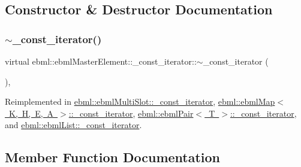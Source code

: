 \subsection{Constructor \& Destructor Documentation}
\mbox{\label{classebml_1_1ebmlMasterElement_1_1__const__iterator_a6138f42b88ff06379d96a095a12ed136}} 
\subsubsection{\texorpdfstring{$\sim$\+\_\+const\+\_\+iterator()}{~\_const\_iterator()}}
{\footnotesize\ttfamily virtual ebml\+::ebml\+Master\+Element\+::\+\_\+const\+\_\+iterator\+::$\sim$\+\_\+const\+\_\+iterator (\begin{DoxyParamCaption}{ }\end{DoxyParamCaption})\hspace{0.3cm}{\ttfamily [inline]}, {\ttfamily [virtual]}}



Reimplemented in \mbox{\hyperlink{classebml_1_1ebmlMultiSlot_1_1__const__iterator_af518a921ebb2e2734b4d045d7d8be0f1}{ebml\+::ebml\+Multi\+Slot\+::\+\_\+const\+\_\+iterator}}, \mbox{\hyperlink{classebml_1_1ebmlMap_1_1__const__iterator_a4f230319e3c3dfa23ed8418d05ec8cc6}{ebml\+::ebml\+Map$<$ K, H, E, A $>$\+::\+\_\+const\+\_\+iterator}}, \mbox{\hyperlink{classebml_1_1ebmlPair_1_1__const__iterator_a2031860865632624af0ff271e7442089}{ebml\+::ebml\+Pair$<$ T $>$\+::\+\_\+const\+\_\+iterator}}, and \mbox{\hyperlink{classebml_1_1ebmlList_1_1__const__iterator_ad0a42056feeeb952125dcedd4eecb2a6}{ebml\+::ebml\+List\+::\+\_\+const\+\_\+iterator}}.



\subsection{Member Function Documentation}
\mbox{\label{classebml_1_1ebmlMasterElement_1_1__const__iterator_a64a4853ad363358987eb6492579cd503}} 
